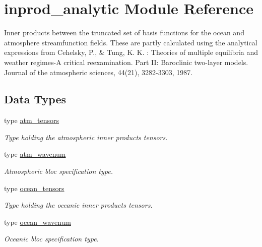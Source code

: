 \hypertarget{namespaceinprod__analytic}{}\section{inprod\+\_\+analytic Module Reference}
\label{namespaceinprod__analytic}


Inner products between the truncated set of basis functions for the ocean and atmosphere streamfunction fields. These are partly calculated using the analytical expressions from Cehelsky, P., \& Tung, K. K. \+: Theories of multiple equilibria and weather regimes-\/A critical reexamination. Part II\+: Baroclinic two-\/layer models. Journal of the atmospheric sciences, 44(21), 3282-\/3303, 1987.  


\subsection*{Data Types}
\begin{DoxyCompactItemize}
\item 
type \hyperlink{structinprod__analytic_1_1atm__tensors}{atm\+\_\+tensors}
\begin{DoxyCompactList}\small\item\em Type holding the atmospheric inner products tensors. \end{DoxyCompactList}\item 
type \hyperlink{structinprod__analytic_1_1atm__wavenum}{atm\+\_\+wavenum}
\begin{DoxyCompactList}\small\item\em Atmospheric bloc specification type. \end{DoxyCompactList}\item 
type \hyperlink{structinprod__analytic_1_1ocean__tensors}{ocean\+\_\+tensors}
\begin{DoxyCompactList}\small\item\em Type holding the oceanic inner products tensors. \end{DoxyCompactList}\item 
type \hyperlink{structinprod__analytic_1_1ocean__wavenum}{ocean\+\_\+wavenum}
\begin{DoxyCompactList}\small\item\em Oceanic bloc specification type. \end{DoxyCompactList}\end{DoxyCompactItemize}
